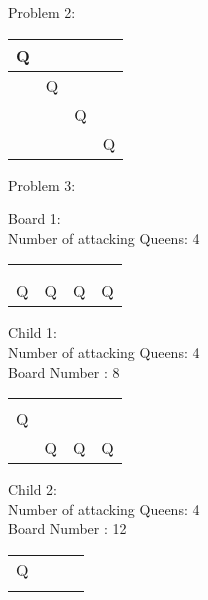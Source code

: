 \documentclass[a4paper,10pt]{article}
\begin{document}
\begin{flushleft}
\begin{flushleft}
\begin{flushleft}
\begin{flushleft}
\vspace{5mm}
Problem 2:\\
\begin{flushleft}
    \begin{tabular}{| l | l | l | l |}
    \hline
     Q & & & \\ \hline
     & Q & &  \\ \hline
     & & Q & \\ \hline
     & & & Q\\ \hline
    \end{tabular}
\break

\vspace{5mm}
\break
Problem 3:\\
\begin{flushleft}
Board 1:\\
Number of attacking Queens: 4\\
\vspace{5mm}
    \begin{tabular}{| l | l | l | l |}
    \hline
     & & & \\ \hline
     & & & \\ \hline
     & & & \\ \hline
     Q & Q & Q & Q \\ \hline
    \end{tabular}
\begin{flushleft}
Child 1:\\
Number of attacking Queens: 4\\
Board Number : 8\\
\vspace{5mm}
    \begin{tabular}{| l | l | l | l |}
    \hline
     & & & \\ \hline
     & & & \\ \hline
     Q & & & \\ \hline
     & Q & Q & Q \\ \hline
    \end{tabular}
\begin{flushleft}
Child 2:\\
Number of attacking Queens: 4\\
Board Number : 12\\
\vspace{5mm}
    \begin{tabular}{| l | l | l | l |}
    \hline
     & & & \\ \hline
     Q & & & \\ \hline
     & & & \\ \hline

\end{tabular}
\end{flushleft}
\end{flushleft}
\end{flushleft}
\end{flushleft}
\end{flushleft}
\end{flushleft}
\end{flushleft}
\end{flushleft}
\end{document}

